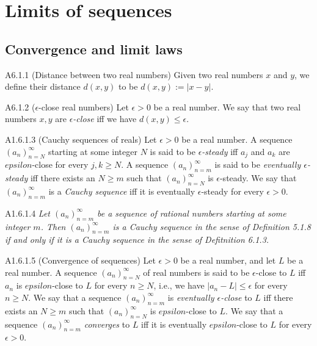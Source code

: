 \section{Limits of sequences}
\subsection{Convergence and limit laws}
\begin{definition}{A6.1.1}
    (Distance between two real numbers) Given two real numbers $x$ and $y$, we
    define their distance $d(x, y)$ to be $d(x, y) := |x - y|$.
\end{definition}

\begin{definition}{A6.1.2}
    ($\epsilon$-close real numbers) Let $\epsilon > 0$ be a real number. We say that
    two real numbers $x, y$ are \emph{$\epsilon$-close} iff we have $d(x, y) \leq \epsilon$.
\end{definition}

\begin{definition}{A1.6.1.3}
    (Cauchy sequences of reals) Let $\epsilon > 0$ be a real number. A sequence
    $(a_n)_{n=N}^{\infty}$ starting at some integer $N$ is said to be \emph{$\epsilon$-steady}
    iff $a_j$ and $a_k$ are $epsilon$-close for every $j, k \geq N$. A sequence
    $(a_n)_{n=m}^{\infty}$ is said to be \emph{eventually $\epsilon$-steady} iff
    there exists an $N \geq m$ such that $(a_n)_{n=N}^{\infty}$ is $\epsilon$-steady.
    We say that $(a_n)_{n=m}^{\infty}$ is a \emph{Cauchy sequence} iff it is
    eventually $\epsilon$-steady for every $\epsilon > 0$.
\end{definition}

\begin{proposition}{A1.6.1.4}
    \emph{Let $(a_n)_{n=m}^{\infty}$ be a sequence of rational numbers starting
    at some integer $m$. Then $(a_n)_{n=m}^{\infty}$ is a Cauchy sequence in the
    sense of Definition 5.1.8 if and only if it is a Cauchy sequence in the sense
    of Defitnition 6.1.3.}
\end{proposition}

\begin{definition}{A1.6.1.5}
    (Convergence of sequences) Let $\epsilon > 0$ be a real number, and let $L$
    be a real number. A sequence $(a_n)_{n=N}^{\infty}$ of real numbers is said
    to be $\epsilon$-close to $L$ iff $a_n$ is $epsilon$-close to $L$ for every
    $n \geq N$, i.e., we have $|a_n - L| \leq \epsilon$ for every $n \geq N$.
    We say that a sequence $(a_n)_{n=m}^{\infty}$ is \emph{eventually $\epsilon$-close}
    to $L$ iff there exists an $N \geq m$ such that $(a_n)_{n=N}^{\infty}$
    is $epsilon$-close to $L$. We say that a sequence $(a_n)_{n=m}^{\infty}$
    \emph{converges} to $L$ iff it is eventually $epsilon$-close to $L$ for every
    $\epsilon > 0$.
\end{definition}

